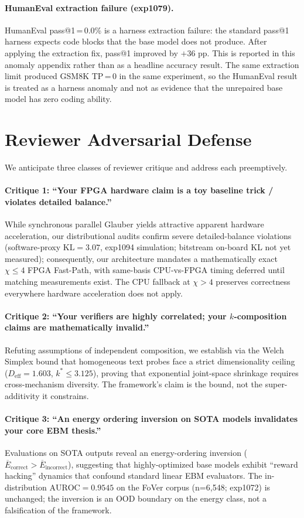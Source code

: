 \documentclass[10pt]{article}
\begin{document}
\paragraph{HumanEval extraction failure (exp1079).}
HumanEval pass@1\,=\,0.0\% is a harness extraction failure: the
standard pass@1 harness expects code blocks that the base model does
not produce. After applying the extraction fix, pass@1 improved by
$+36$ pp. This is reported in this anomaly appendix rather than as a
headline accuracy result. The same extraction limit produced
GSM8K TP\,=\,0 in the same experiment, so the HumanEval result is
treated as a harness anomaly and not as evidence that the unrepaired
base model has zero coding ability.

\section{Reviewer Adversarial Defense}

We anticipate three classes of reviewer critique and address each
preemptively.

\paragraph{Critique 1: ``Your FPGA hardware claim is a toy baseline trick
/ violates detailed balance.''}
While synchronous parallel Glauber yields attractive apparent hardware
acceleration,
our distributional audits confirm severe detailed-balance violations
(software-proxy $\mathrm{KL} = 3.07$, exp1094 simulation; bitstream
on-board KL not yet measured); consequently, our architecture
mandates a mathematically exact $\chi \leq 4$ FPGA Fast-Path,
with same-basis CPU-vs-FPGA timing deferred until matching
measurements exist. The CPU fallback at $\chi > 4$ preserves
correctness everywhere hardware acceleration does not apply.

\paragraph{Critique 2: ``Your verifiers are highly correlated; your
$k$-composition claims are mathematically invalid.''}
Refuting assumptions of independent composition, we establish via
the Welch Simplex bound that homogeneous text probes face a strict
dimensionality ceiling ($D_{\mathrm{eff}} = 1.603$,
$k^* \leq 3.125$), proving that exponential joint-space shrinkage
requires cross-mechanism diversity. The framework's claim is the
bound, not the super-additivity it constrains.

\paragraph{Critique 3: ``An energy ordering inversion on SOTA
models invalidates your core EBM thesis.''}
Evaluations on SOTA outputs reveal an energy-ordering inversion
($\overline{E}_{\mathrm{correct}} > \overline{E}_{\mathrm{incorrect}}$),
suggesting that highly-optimized base models exhibit ``reward
hacking'' dynamics that confound standard linear EBM evaluators.
The in-distribution $\mathrm{AUROC} = 0.9545$ on the FoVer corpus
(n=6{,}548; exp1072) is unchanged;
the inversion is an OOD boundary on the energy class, not a
falsification of the framework.
\end{document}
